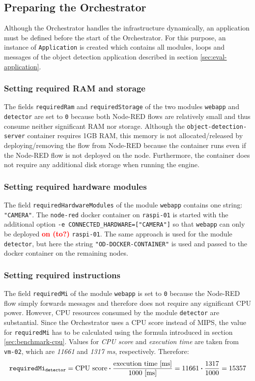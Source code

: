 \subsection*{Preparing the Orchestrator}

Although the Orchestrator handles the infrastructure dynamically, an application must be defined before the start of the Orchestrator. For this purpose, an instance of \texttt{Application} is created which contains all modules, loops and messages of the object detection application described in section \ref{sec:eval-application}.

\subsubsection*{Setting required RAM and storage}
The fields \texttt{requiredRam} and \texttt{requiredStorage} of the two modules \texttt{webapp} and \texttt{detector} are set to \texttt{0} because both Node-RED flows are relatively small and thus consume neither significant RAM nor storage. Although the \texttt{object-detection-server} container requires 1GB RAM, this memory is not allocated/released by deploying/removing the flow from Node-RED because the container runs even if the Node-RED flow is not deployed on the node. Furthermore, the container does not require any additional disk storage when running the engine.

\subsubsection*{Setting required hardware modules}
The field \texttt{requiredHardwareModules} of the module \texttt{webapp} contains one string: \texttt{"CAMERA"}. The \texttt{node-red} docker container on \texttt{raspi-01} is started with the additional option \texttt{-e CONNECTED\_HARDWARE=["CAMERA"]} so that \texttt{webapp} can only be deployed \textcolor{red}{\textbf{on (to?)}} \texttt{raspi-01}. The same approach is used for the module \texttt{detector}, but here the string \texttt{"OD-DOCKER-CONTAINER"} is used and passed to the docker container on the remaining nodes.

\subsubsection*{Setting required instructions}
The field \texttt{requiredMi} of the module \texttt{webapp} is set to \texttt{0} because the Node-RED flow simply forwards messages and therefore does not require any significant CPU power. However, CPU resources consumed by the module \texttt{detector} are substantial. Since the Orchestrator uses a CPU score instead of MIPS, the value for \texttt{requiredMi} has to be calculated using the formula introduced in section \ref{sec:benchmark-cpu}. Values for \textit{CPU score} and \textit{execution time} are taken from \texttt{vm-02}, which are \textit{11661} and \textit{1317 ms}, respectively. Therefore:
\[\textrm{\texttt{requiredMi\textsubscript{detector}}} = \textrm{CPU score} \boldsymbol{\cdot} \frac{\textrm{execution time [ms]}}{1000 \textrm{ [ms]}} = 11661 \boldsymbol{\cdot} \frac{1317}{1000} = 15357\]


